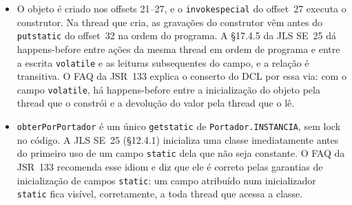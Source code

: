 \begin{itemize}
  entrada cobre os offsets 40 a 42 com o mesmo destino.
\item O objeto é criado nos offsets 21--27, e o \texttt{invokespecial}
  do offset~27 executa o construtor. Na thread que cria, as gravações
  do construtor vêm antes do \texttt{putstatic} do offset~32 na ordem
  do programa. A §17.4.5 da JLS SE~25 dá happens-before entre ações da
  mesma thread em ordem de programa e entre a escrita \texttt{volatile}
  e as leituras subsequentes do campo, e a relação é transitiva. O FAQ
  da JSR~133 explica o conserto do DCL por essa via: com o campo
  \texttt{volatile}, há happens-before entre a inicialização do objeto
  pela thread que o constrói e a devolução do valor pela thread que o
  lê.
\item \texttt{obterPorPortador} é um único \texttt{getstatic} de
  \texttt{Portador.INSTANCIA}, sem lock no código. A JLS SE~25 (§12.4.1)
  inicializa uma classe imediatamente antes do primeiro uso de um campo
  \texttt{static} dela que não seja constante. O FAQ da JSR~133
  recomenda esse idiom e diz que ele é correto pelas garantias de
  inicialização de campos \texttt{static}: um campo atribuído num
  inicializador \texttt{static} fica visível, corretamente, a toda
  thread que acessa a classe.
\end{itemize}

